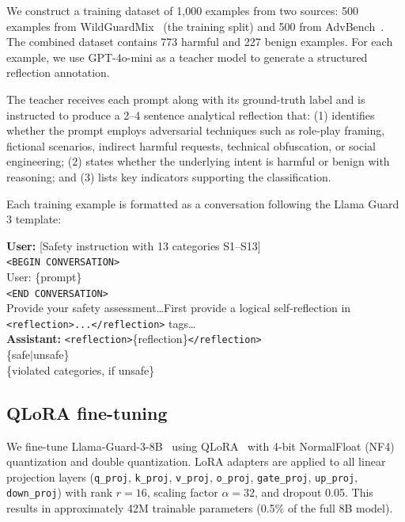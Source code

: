 \documentclass[11pt]{article}
\begin{document}
We construct a training dataset of 1{,}000 examples from two sources: 500 examples from WildGuardMix~\citep{han2024wildguard} (the training split) and 500 from AdvBench~\citep{zou2023universal}. The combined dataset contains 773 harmful and 227 benign examples. For each example, we use GPT-4o-mini as a teacher model to generate a structured reflection annotation.

The teacher receives each prompt along with its ground-truth label and is instructed to produce a 2--4 sentence analytical reflection that: (1) identifies whether the prompt employs adversarial techniques such as role-play framing, fictional scenarios, indirect harmful requests, technical obfuscation, or social engineering; (2) states whether the underlying intent is harmful or benign with reasoning; and (3) lists key indicators supporting the classification.

Each training example is formatted as a conversation following the Llama Guard 3 template:
\begin{tcolorbox}[graybox]
\textbf{User:} [Safety instruction with 13 categories S1--S13] \\
\texttt{<BEGIN CONVERSATION>} \\
User: \{prompt\} \\
\texttt{<END CONVERSATION>} \\
Provide your safety assessment\ldots First provide a logical self-reflection in \texttt{<reflection>...</reflection>} tags\ldots \\[4pt]
\textbf{Assistant:} \texttt{<reflection>}\{reflection\}\texttt{</reflection>} \\
\{safe$|$unsafe\} \\
\{violated categories, if unsafe\}
\end{tcolorbox}

\subsection{QLoRA fine-tuning}

We fine-tune Llama-Guard-3-8B~\citep{metallamaguard3} using QLoRA~\citep{dettmers2024qlora} with 4-bit NormalFloat (NF4) quantization and double quantization. LoRA adapters are applied to all linear projection layers (\texttt{q\_proj}, \texttt{k\_proj}, \texttt{v\_proj}, \texttt{o\_proj}, \texttt{gate\_proj}, \texttt{up\_proj}, \texttt{down\_proj}) with rank $r = 16$, scaling factor $\alpha = 32$, and dropout 0.05. This results in approximately 42M trainable parameters (0.5\% of the full 8B model).
\end{document}
